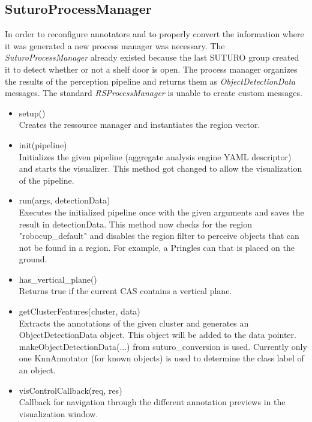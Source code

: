 \documentclass[main.tex]{subfiles}
\begin{document}
\subsection{SuturoProcessManager}
In order to reconfigure annotators and to properly convert the information where it was generated a new process manager was necessary.
The \textit{SuturoProcessManager} already existed because the last SUTURO group created it to detect whether or not a shelf door is open.
The process manager organizes the results of the perception pipeline and returns them as \textit{ObjectDetectionData} messages.
The standard \textit{RSProcessManager} is unable to create custom messages.

\begin{itemize}
\item setup()\\
Creates the ressource manager and instantiates the region vector.

\item init(pipeline)\\
Initializes the given pipeline (aggregate analysis engine YAML descriptor) and starts the visualizer.
This method got changed to allow the visualization of the pipeline.

\item run(args, detectionData)\\
Executes the initialized pipeline once with the given arguments and saves the result in detectionData.
This method now checks for the region "robocup\_default" and disables the region filter to perceive objects that can not be found
in a region. For example, a Pringles can that is placed on the ground.

\item has\_vertical\_plane()\\
Returns true if the current CAS contains a vertical plane.

\item getClusterFeatures(cluster, data)\\
Extracts the annotations of the given cluster and generates an ObjectDetectionData object. 
This object will be added to the data pointer. makeObjectDetectionData(...) from suturo\_conversion is used.
Currently only one KnnAnnotator (for known objects) is used to determine the class label of an object.

\item visControlCallback(req, res)\\
Callback for navigation through the different annotation previews in the visualization window.
\end{itemize}
\end{document}
